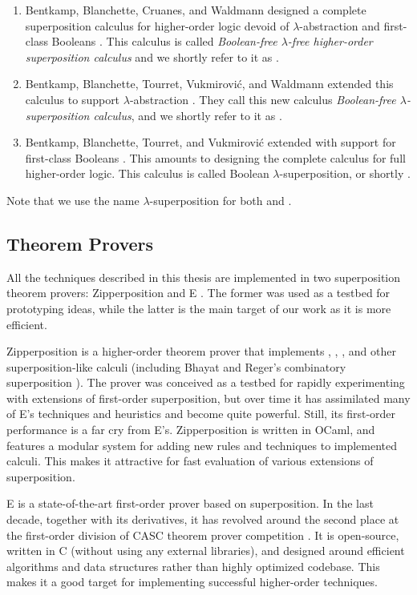 \begin{enumerate}
    \item Bentkamp, Blanchette, Cruanes, and Waldmann designed a complete
    superposition calculus for higher-order logic devoid of
    $\lambda$-abstraction and first-class Booleans \cite{bbcw-21-lfho}. This calculus is called \emph{Boolean-free $\lambda$-free higher-order superposition calculus} 
    and we shortly refer to it as \lfsup{}.
    \item \begin{sloppypar}
    Bentkamp, Blanchette, Tourret,  Vukmirović, and Waldmann
    extended this calculus to support $\lambda$-abstraction
    \cite{bbtvw-21-sup-lam}. They call this new calculus \emph{Boolean-free $\lambda$-superposition calculus},
    and we shortly refer to it as \lsup{}.
    \end{sloppypar}        
    \item Bentkamp, Blanchette, Tourret, and Vukmirovi\'c extended \lsup{} with
    support for first-class Booleans \cite{bbtv-21-full-ho-sup}. This amounts to
    designing the complete calculus for full higher-order logic. This
    calculus is called Boolean $\lambda$-superposition, or shortly \osup{}.
\end{enumerate}
%
Note that we use the name $\lambda$-superposition for both \lsup{}
and \osup{}.

\subsection{Theorem Provers}
\label{sec:pre:theorem-provers}

All the techniques described in this thesis are implemented in two superposition
theorem provers: Zipperposition
\cite{sc-15-simon-phd,sc-supind-17} and E \cite{ss-02-brainiac}. The former was used as a testbed for
prototyping ideas, while the latter is the main target of our work as it is more
efficient.

Zipperposition is a higher-order theorem prover that implements \lfsup{},
\lsup{}, \osup{}, and other superposition-like calculi (including Bhayat and
Reger's combinatory superposition \cite{br-20-full-sup-w-combs}). The prover was
conceived as a testbed for rapidly experimenting with extensions of first-order
superposition, but over time it has assimilated many of E's techniques and
heuristics and become quite powerful. Still, its first-order performance is a
far cry from E's. Zipperposition is written in OCaml, and features a modular
system for adding new rules and techniques to implemented calculi.
This makes it attractive for fast evaluation of various extensions of
superposition.

 E is a state-of-the-art first-order prover based on superposition.
In the last decade, together with its derivatives, it has revolved around the
second place at the first-order division of CASC theorem prover
competition \cite{ss-96-casc}. It is open-source, written in C (without using any
external libraries), and designed around efficient algorithms and data structures
rather than highly optimized codebase. This makes it a good target for implementing
successful higher-order techniques.


